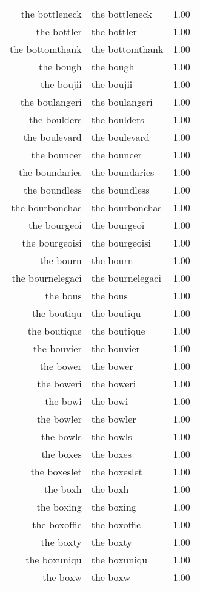 \begin{table}[ht]
\begin{tabular}{rlr}
  the bottleneck & the bottleneck & 1.00 \\ 
  the bottler & the bottler & 1.00 \\ 
  the bottomthank & the bottomthank & 1.00 \\ 
  the bough & the bough & 1.00 \\ 
  the boujii & the boujii & 1.00 \\ 
  the boulangeri & the boulangeri & 1.00 \\ 
  the boulders & the boulders & 1.00 \\ 
  the boulevard & the boulevard & 1.00 \\ 
  the bouncer & the bouncer & 1.00 \\ 
  the boundaries & the boundaries & 1.00 \\ 
  the boundless & the boundless & 1.00 \\ 
  the bourbonchas & the bourbonchas & 1.00 \\ 
  the bourgeoi & the bourgeoi & 1.00 \\ 
  the bourgeoisi & the bourgeoisi & 1.00 \\ 
  the bourn & the bourn & 1.00 \\ 
  the bournelegaci & the bournelegaci & 1.00 \\ 
  the bous & the bous & 1.00 \\ 
  the boutiqu & the boutiqu & 1.00 \\ 
  the boutique & the boutique & 1.00 \\ 
  the bouvier & the bouvier & 1.00 \\ 
  the bower & the bower & 1.00 \\ 
  the boweri & the boweri & 1.00 \\ 
  the bowi & the bowi & 1.00 \\ 
  the bowler & the bowler & 1.00 \\ 
  the bowls & the bowls & 1.00 \\ 
  the boxes & the boxes & 1.00 \\ 
  the boxeslet & the boxeslet & 1.00 \\ 
  the boxh & the boxh & 1.00 \\ 
  the boxing & the boxing & 1.00 \\ 
  the boxoffic & the boxoffic & 1.00 \\ 
  the boxty & the boxty & 1.00 \\ 
  the boxuniqu & the boxuniqu & 1.00 \\ 
  the boxw & the boxw & 1.00 \\ 

\end{tabular}
\end{table}
